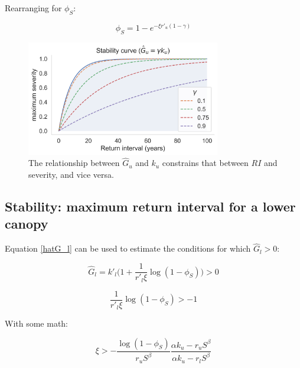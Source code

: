 \documentclass{article}
\begin{document}
        Rearranging for $\phi_S$:
        
        
        \begin{equation}
        \phi_S = 1- e^{-\xi r'_u (1-\gamma)}
        \label{max_severity}
        \end{equation}
        
        
 \begin{figure}[h]
 \centering
\includegraphics[width=20pc]{../fire_plots/stability.png}
 \caption{ The relationship between $\hat G_u$ and $k_u$ constrains that between $RI$ and severity, and vice versa.}
 \label{fig:stability}
 \end{figure}
   
   
\subsection{Stability: maximum return interval for a lower canopy}


Equation \ref{hatG_l} can be used to estimate the conditions for which $\hat G_l >0$:

\begin{equation}
\hat{G}_l =
 		k'_l \big( 1 + \frac{1}{r'_l \xi} \log(1-\phi_S) \big) > 0
\end{equation}


\begin{equation}
 		\frac{1}{r'_l \xi} \log(1-\phi_S) > -1
\end{equation}

With some math:

\begin{equation}
 	\xi > - \frac{\log(1-\phi_S)}{r_u S^\beta} \frac{\alpha k_u - r_u S^\beta}{\alpha k_u - r_l S^\beta}
\end{equation}
\end{document}

